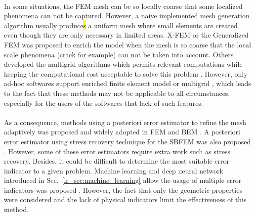 \paragraph{}
In some situations, the FEM mesh can be so locally coarse that some localized phenomena can not be captured.
However, a naive implemented mesh generation algorithm usually produce\hl{s} a uniform mesh where small elements are created even though they are only necessary in limited areas.
X-FEM \citep{Moes1999} or the Generalized FEM \citep{STROUBOULIS20014081,doi:10.1002/nme.4954} was proposed to enrich the model when the mesh is so coarse that the local scale phenomena (crack for example) can not be taken into account.
Others developed the multigrid algorithms which permits relevant computations while keeping the computational cost acceptable to solve this problem \citep{doi:10.1002/nme.2427, doi:10.1002/nme.3037}.
However, only ad-hoc softwares support enriched finite element model or multigrid \citep{Duval2018}, which leads to the fact that these methods may not be applicable to all circumstances, especially for the users of the softwares that lack of such features.

\paragraph{}
As a consequence, methods using a posteriori error estimator to refine the mesh adaptively was proposed and widely adopted in FEM \citep{Duval2018, doi:10.1002/gamm.201490020,PRUDHOMME20091887,BAUMAN2009799, doi:10.1002/nme.1620121010, doi:10.1002/nme.1620240618,Oden1989,doi:10.1002/nme.1620240206,doi:10.1002/nme.1620330702,doi:10.1002/nme.1620330703, BOROOMAND1999127, ZIENKIEWICZ1999111, Ainsworth1993} and BEM \citep{Zhao1998, Guiggiani1990, KAMIYA1992223, KITA199421,ZHAO1999793,KITA2000317}.
A posteriori error estimator using stress recovery technique for the SBFEM was also proposed \citep{NME:NME439}.
However, some of these error estimators require extra work such as stress recovery.
Besides, it could be difficult to determine the most suitable error indicator to a given problem.
Machine learning and deep neural network introduced in Sec.~\ref{lr_sec:machine_learning} allow the usage of multiple error indicators was proposed \citep{SaeedIqbal;Graham.F.Carey2005}.
However, the fact that only the geometric properties were considered and the lack of physical indicators limit the effectiveness of this method.

